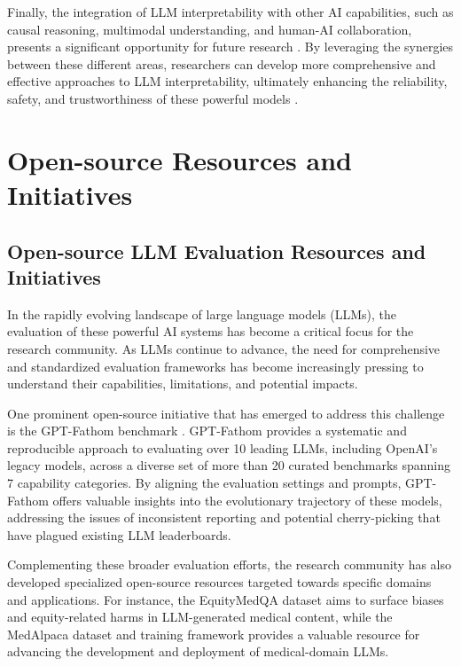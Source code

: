\documentclass[11pt]{article}
\begin{document}
Finally, the integration of LLM interpretability with other AI capabilities, such as causal reasoning, multimodal understanding, and human-AI collaboration, presents a significant opportunity for future research \cite{ref302,ref303}. By leveraging the synergies between these different areas, researchers can develop more comprehensive and effective approaches to LLM interpretability, ultimately enhancing the reliability, safety, and trustworthiness of these powerful models \cite{ref304,ref299}.

\section{Open-source Resources and Initiatives}

\subsection{Open-source LLM Evaluation Resources and Initiatives}

In the rapidly evolving landscape of large language models (LLMs), the evaluation of these powerful AI systems has become a critical focus for the research community. As LLMs continue to advance, the need for comprehensive and standardized evaluation frameworks has become increasingly pressing to understand their capabilities, limitations, and potential impacts.

One prominent open-source initiative that has emerged to address this challenge is the GPT-Fathom benchmark \cite{ref83}. GPT-Fathom provides a systematic and reproducible approach to evaluating over 10 leading LLMs, including OpenAI's legacy models, across a diverse set of more than 20 curated benchmarks spanning 7 capability categories. By aligning the evaluation settings and prompts, GPT-Fathom offers valuable insights into the evolutionary trajectory of these models, addressing the issues of inconsistent reporting and potential cherry-picking that have plagued existing LLM leaderboards.

Complementing these broader evaluation efforts, the research community has also developed specialized open-source resources targeted towards specific domains and applications. For instance, the EquityMedQA dataset \cite{ref81} aims to surface biases and equity-related harms in LLM-generated medical content, while the MedAlpaca dataset and training framework \cite{ref85} provides a valuable resource for advancing the development and deployment of medical-domain LLMs.
\end{document}
